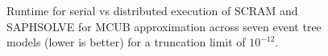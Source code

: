 \begin{figure}[]
  \centering
  
  \caption{Runtime for serial vs distributed execution of SCRAM and SAPHSOLVE for MCUB approximation across seven event tree models (lower is better) for a truncation limit of $10^{-12}$.}
  \label{fig:distributed_mcub_runtime_1e12}
\end{figure}
